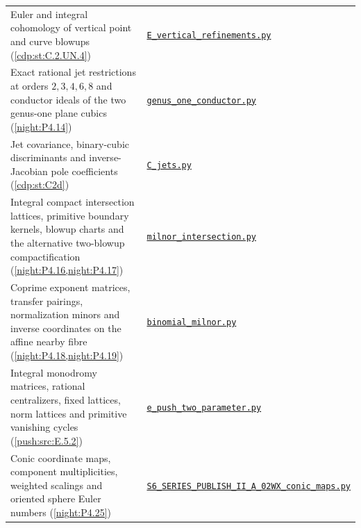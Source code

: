 {\begin{longtable}{@{}>{\raggedright\arraybackslash}p{}>{\raggedright\arraybackslash}p{}@{}}
Euler and integral cohomology of vertical point and curve blowups (\cref{cdp:st:C.2.UN.4}) & \href{https://raw.githubusercontent.com/KokunoYumeto/s6-complex-structure-workbench/\SsixRepositoryCommit/pro_returns/S6_03_CDP_checkpoint_13_20261116T0136Z/S6_03_CDP/code/E_vertical_refinements.py}{\nolinkurl{E_vertical_refinements.py}} \\[3pt]
Exact rational jet restrictions at orders $2,3,4,6,8$ and conductor ideals of the two genus-one plane cubics (\cref{night:P4.14}) & \href{https://raw.githubusercontent.com/KokunoYumeto/s6-complex-structure-workbench/\SsixRepositoryCommit/pro_returns/S6_06_BLIND_checkpoint_15_20261117T1457Z/S6_06_BLIND/code/part4/genus_one_conductor.py}{\nolinkurl{genus_one_conductor.py}} \\[3pt]
Jet covariance, binary-cubic discriminants and inverse-Jacobian pole coefficients (\cref{cdp:st:C2d}) & \href{https://raw.githubusercontent.com/KokunoYumeto/s6-complex-structure-workbench/\SsixRepositoryCommit/pro_returns/S6_03_CDP_checkpoint_13_20261116T0136Z/S6_03_CDP/code/C_jets.py}{\nolinkurl{C_jets.py}} \\[3pt]
Integral compact intersection lattices, primitive boundary kernels, blowup charts and the alternative two-blowup compactification (\cref{night:P4.16,night:P4.17}) & \href{https://raw.githubusercontent.com/KokunoYumeto/s6-complex-structure-workbench/\SsixRepositoryCommit/pro_returns/S6_06_BLIND_checkpoint_15_20261117T1457Z/S6_06_BLIND/code/part4/milnor_intersection.py}{\nolinkurl{milnor_intersection.py}} \\[3pt]
Coprime exponent matrices, transfer pairings, normalization minors and inverse coordinates on the affine nearby fibre (\cref{night:P4.18,night:P4.19}) & \href{https://raw.githubusercontent.com/KokunoYumeto/s6-complex-structure-workbench/\SsixRepositoryCommit/pro_returns/S6_06_BLIND_checkpoint_15_20261117T1457Z/S6_06_BLIND/code/part4/binomial_milnor.py}{\nolinkurl{binomial_milnor.py}} \\[3pt]
Integral monodromy matrices, rational centralizers, fixed lattices, norm lattices and primitive vanishing cycles (\cref{push:src:E.5.2}) & \href{https://raw.githubusercontent.com/KokunoYumeto/s6-complex-structure-workbench/\SsixRepositoryCommit/pro_returns/S6_02_PUSH_final_20261115T2217Z/S6_02_PUSH/code/e_push_two_parameter.py}{\nolinkurl{e_push_two_parameter.py}} \\[3pt]
Conic coordinate maps, component multiplicities, weighted scalings and oriented sphere Euler numbers (\cref{night:P4.25}) & \href{https://raw.githubusercontent.com/KokunoYumeto/s6-complex-structure-workbench/\SsixRepositoryCommit/code/S6_SERIES_PUBLISH_II_A_02WX_conic_maps.py}{\nolinkurl{S6_SERIES_PUBLISH_II_A_02WX_conic_maps.py}} \\[3pt]

\end{longtable}}
